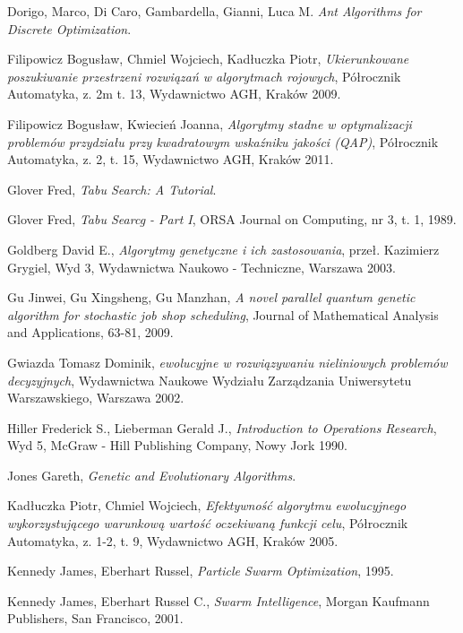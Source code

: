 
%
\begin{thebibliography}{99}

 Dorigo, Marco, Di Caro, Gambardella, Gianni, Luca M. \textit{Ant Algorithms for Discrete Optimization}.

 Filipowicz Bogusław, Chmiel Wojciech, Kadłuczka Piotr, \textit{Ukierunkowane poszukiwanie przestrzeni rozwiązań w algorytmach rojowych}, Półrocznik Automatyka, z. 2m t. 13, Wydawnictwo AGH, Kraków 2009.

 Filipowicz Bogusław, Kwiecień Joanna, \textit{Algorytmy stadne w optymalizacji problemów przydziału przy kwadratowym wskaźniku jakości (QAP)}, Półrocznik Automatyka, z. 2, t. 15, Wydawnictwo AGH, Kraków 2011.

 Glover Fred, \textit{Tabu Search: A Tutorial}.

 Glover Fred, \textit{Tabu Searcg - Part I}, ORSA Journal on Computing, nr 3, t. 1, 1989.

 Goldberg David E., \textit{Algorytmy genetyczne i ich zastosowania}, przeł. Kazimierz Grygiel, Wyd 3, Wydawnictwa Naukowo - Techniczne, Warszawa 2003.

 Gu Jinwei, Gu Xingsheng, Gu Manzhan, \textit{A novel parallel quantum genetic algorithm for stochastic job shop scheduling}, Journal of Mathematical Analysis and Applications, 63-81, 2009.

 Gwiazda Tomasz Dominik, \textit{ ewolucyjne w rozwiązywaniu nieliniowych problemów decyzyjnych}, Wydawnictwa Naukowe Wydziału Zarządzania Uniwersytetu Warszawskiego, Warszawa 2002.

 Hiller Frederick S., Lieberman Gerald J., \textit{Introduction to Operations Research}, Wyd 5, McGraw - Hill Publishing Company, Nowy Jork 1990.

 Jones Gareth, \textit{Genetic and Evolutionary Algorithms}.

 Kadłuczka Piotr, Chmiel Wojciech, \textit{Efektywność algorytmu ewolucyjnego wykorzystującego warunkową wartość oczekiwaną funkcji celu}, Półrocznik Automatyka, z. 1-2, t. 9, Wydawnictwo AGH, Kraków 2005.

 Kennedy James, Eberhart Russel, \textit{Particle Swarm Optimization}, 1995.

 Kennedy James, Eberhart Russel C., \textit{Swarm Intelligence}, Morgan Kaufmann Publishers, San Francisco, 2001.


\end{thebibliography}
